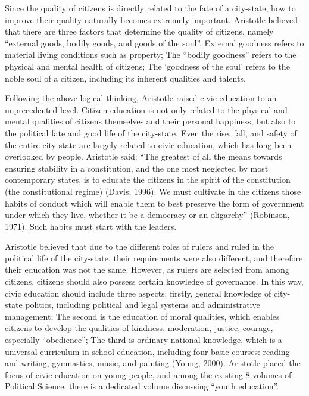 \documentclass[11pt]{article}
\begin{document}
Since the quality of citizens is directly related to the fate of a city-state, how to improve their quality naturally becomes extremely important. Aristotle believed that there are three factors that determine the quality of citizens, namely “external goods, bodily goods, and goods of the soul”. External goodness refers to material living conditions such as property; The “bodily goodness” refers to the physical and mental health of citizens; The ‘goodness of the soul' refers to the noble soul of a citizen, including its inherent qualities and talents.

Following the above logical thinking, Aristotle raised civic education to an unprecedented level. Citizen education is not only related to the physical and mental qualities of citizens themselves and their personal happiness, but also to the political fate and good life of the city-state. Even the rise, fall, and safety of the entire city-state are largely related to civic education, which has long been overlooked by people. Aristotle said: “The greatest of all the means towards ensuring stability in a constitution, and the one most neglected by most contemporary states, is to educate the citizens in the spirit of the constitution (the constitutional regime) (Davis, 1996). We must cultivate in the citizens those habits of conduct which will enable them to best preserve the form of government under which they live, whether it be a democracy or an oligarchy” (Robinson, 1971). Such habits must start with the leaders.

Aristotle believed that due to the different roles of rulers and ruled in the political life of the city-state, their requirements were also different, and therefore their education was not the same. However, as rulers are selected from among citizens, citizens should also possess certain knowledge of governance. In this way, civic education should include three aspects: firstly, general knowledge of city-state politics, including political and legal systems and administrative management; The second is the education of moral qualities, which enables citizens to develop the qualities of kindness, moderation, justice, courage, especially “obedience”; The third is ordinary national knowledge, which is a universal curriculum in school education, including four basic courses: reading and writing, gymnastics, music, and painting (Young, 2000). Aristotle placed the focus of civic education on young people, and among the existing 8 volumes of Political Science, there is a dedicated volume discussing “youth education”.
\end{document}

